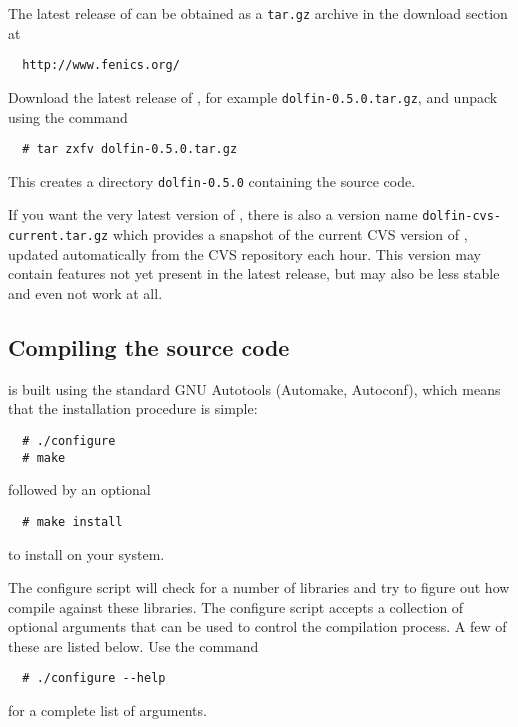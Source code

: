 The latest release of \dolfin{} can be obtained as a \texttt{tar.gz}
archive in the download section at
\begin{verbatim}
  http://www.fenics.org/
\end{verbatim}

Download the latest release of \dolfin{}, for example \texttt{dolfin-0.5.0.tar.gz},
and unpack using the command
\begin{verbatim}
  # tar zxfv dolfin-0.5.0.tar.gz
\end{verbatim}

This creates a directory \texttt{dolfin-0.5.0} containing the
\dolfin{} source code.

If you want the very latest version of \dolfin{}, there is also a
version name \texttt{dolfin-cvs-current.tar.gz} which provides a
snapshot of the current CVS version of \dolfin{}, updated
automatically from the CVS repository each hour. This version may
contain features not yet present in the latest release, but may also
be less stable and even not work at all.

\subsection{Compiling the source code}

\dolfin{} is built using the standard GNU Autotools (Automake,
Autoconf), which means that the installation procedure is simple:
\begin{verbatim}
  # ./configure
  # make
\end{verbatim}
followed by an optional
\begin{verbatim}
  # make install
\end{verbatim}
to install \dolfin{} on your system.

The configure script will check for a number of libraries and try
to figure out how compile \dolfin{} against these libraries. The
configure script accepts a collection of optional arguments that can be
used to control the compilation process. A few of these are listed
below. Use the command
\begin{verbatim}
  # ./configure --help
\end{verbatim}
for a complete list of arguments.

